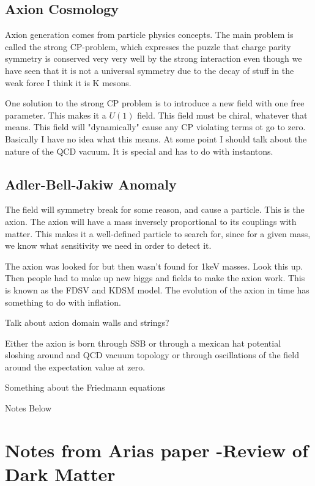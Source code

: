\documentclass[12pt, twoside]{book}
\begin{document}
\subsection{Axion Cosmology}

Axion generation comes from particle physics concepts. The main problem is called the strong CP-problem, which expresses the puzzle that charge parity symmetry is conserved very very well by the strong interaction even though we have seen that it is not a universal symmetry due to the decay of stuff in the weak force I think it is K mesons.

One solution to the strong CP problem is to introduce a new field with one free parameter. This makes it a $U(1)$ field. This field must be chiral, whatever that means. This field will "dynamically" cause any CP violating terms ot go to zero. Basically I have no idea what this means. At some point I should talk about the nature of the QCD vacuum. It is special and has to do with instantons.

\subsection{Adler-Bell-Jakiw Anomaly}

The field will symmetry break for some reason, and cause a particle. This is the axion. The axion will have a mass inversely proportional to its couplings with matter. This makes it a well-defined particle to search for, since for a given mass, we know what sensitivity we need in order to detect it.

The axion was looked for but then wasn't found for 1keV masses. Look this up. Then people had to make up new higgs and fields to make the axion work. This is known as the FDSV and KDSM model. The evolution of the axion in time has something to do with inflation.

Talk about axion domain walls and strings?

Either the axion is born through SSB or through a mexican hat potential sloshing around and QCD vacuum topology or through oscillations of the field around the expectation value at zero. 

Something about the Friedmann equations

{\color{red} Notes Below}

\section{Notes from Arias paper -Review of Dark Matter}
\end{document}

